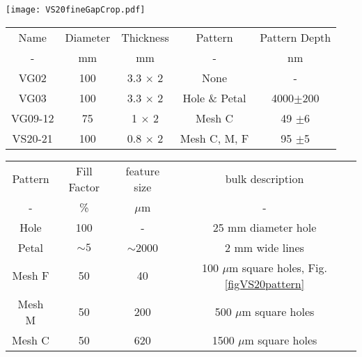 \documentclass[osajnl,twocolumn,showpacs,superscriptaddress,11pt]{revtex4-1} %
\begin{document}
\begin{figure*}[!htbp]
\texttt{[image: VS20fineGapCrop.pdf]}
\caption{
\label{figVS20pattern}
Veeco optical profiler surface plot and histogram for part VS20-21 in the fine pattern section.  The 100 mm diameter VS20-21 is comprised of two thick silicon wafers.  We patterned three meshes with coarse, medium, and fine boxes, each with 50\% fill factors.  The depth was $95 \pm 5\;$nm as indicated by the well-separated peaks in the Veeco profilometry histogram.  The fill factor for this and all mesh patterns was 50\%.  The purpose for these patterns was to have gaps of known axial extent against which we could test the optical metrology technique we describe in this article.}
\end{figure*}

\begin{table*}[!htbp]
\caption{UTexas Si bonding experiments \label{tbl_experiments}}
\begin{center}
    \begin{tabular}{ c c c c c}
    \hline
    Name & Diameter & Thickness & Pattern & Pattern Depth\\ 
    -  & mm & mm & - & nm \\
        \hline
    VG02   & 100 & 3.3 $\times$ 2 &  None  & - \\
    VG03   & 100 & 3.3 $\times$ 2 &  Hole \& Petal & 4000$\pm$200 \\
    VG09-12   & 75   & 1 $\times$ 2 & Mesh C & 49 $\pm$6 \\
    VS20-21   & 100 & 0.8 $\times$ 2 &  Mesh C, M, F & 95 $\pm$5 \\
    \hline
    \end{tabular}
\end{center}
\end{table*}


\begin{table*}[!htbp]
\caption{Patterned gap properties \label{tbl_meshPatterns}}
\begin{center}
    \begin{tabular}{ c c c c }
    \hline
    Pattern & Fill Factor & feature size & bulk description \\ 
    - & \% & $\mu$m & - \\ 
    \hline
    Hole   & 100     &  -         & 25 mm diameter hole \\     
    Petal  & $\sim5$ & $\sim$2000 & 2 mm wide lines \\         
    Mesh F & 50      &         40 & 100 $\mu$m square holes, Fig. \ref{figVS20pattern}\\ 
    Mesh M & 50      & 200        & 500 $\mu$m square holes\\ 
    Mesh C & 50      & 620        & 1500 $\mu$m square holes\\     
        \hline
    \end{tabular}
\end{center}
\end{table*}
\end{document}
